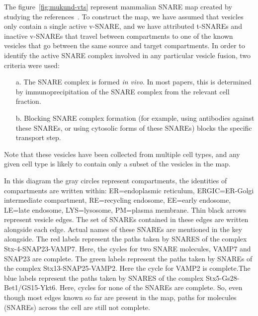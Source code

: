 









  
The figure~\ref{fig:mukund-vts} represent mammalian SNARE map created by studying the references~\cite{somya}. 
To construct the map, we have assumed that vesicles only contain a single
active v-SNARE, and we have attributed t-SNAREs and inactive v-SNAREs that
travel between compartments to one of the known vesicles that go between
the same source and target compartments.
In order to identify the active SNARE complex involved in any particular
vesicle fusion, two criteria were used: 
\begin{enumerate}
\item[a.] The SNARE complex is formed \textit{in vivo}. In most papers, this is determined by immunoprecipitation of the SNARE complex from the relevant cell fraction. 
\item[b.] Blocking SNARE complex formation (for example, using antibodies against these SNAREs, or
using cytosolic forms of these SNAREs) blocks the specific transport step.
\end{enumerate}


Note that these vesicles have been collected from multiple cell types, and
any given cell type is likely to contain only a subset of the vesicles in
the map.

In this diagram the gray circles represent compartments, the identities of compartments are
written within: ER=endoplasmic reticulum, ERGIC=ER-Golgi intermediate compartment,
RE=recycling endosome, EE=early endosome, LE=late endosome, LYS=lysosome, PM=plasma
membrane. Thin black arrows represent vesicle edges.
The set of SNAREs contained in these edges are written alongside each edge. Actual names
of these SNAREs are mentioned in the key alongside. The red labels represent the paths taken by
SNARES of the complex Stx-4-SNAP23-VAMP7. Here, the cycles for two SNARE molecules,
VAMP7 and SNAP23 are complete. The green labels represent the paths taken by SNAREs of the
complex Stx13-SNAP25-VAMP2. Here the cycle for VAMP2 is complete.The blue labels represent
the paths taken by SNARES of the complex Stx5-Gs28-Bet1/GS15-Ykt6. Here, cycles for none of
the SNAREs are complete. So, even though most edges known so far are present in the map, paths for molecules (SNAREs) across the cell are still not complete.

